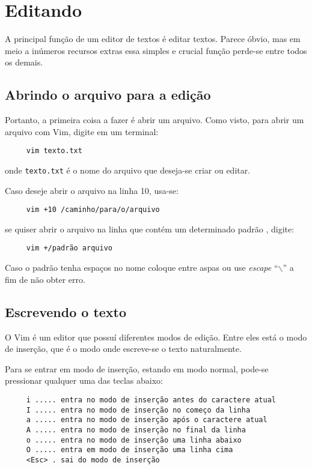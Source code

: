
\chapter{Editando}
\label{Editando}
A principal função de um editor de textos é editar textos. 
Parece óbvio, mas em meio a inúmeros recursos extras essa simples e crucial
função perde-se entre todos os demais.

\section{Abrindo o arquivo para a edição}
Portanto, a primeira coisa a fazer é abrir um arquivo.
Como visto, para abrir um arquivo com Vim, digite em um terminal:
%
\begin{verbatim}
     vim texto.txt
\end{verbatim}
onde {\tt texto.txt} é o nome do arquivo que deseja-se criar ou editar.

Caso deseje abrir o arquivo na linha 10, usa-se:
\begin{verbatim}
     vim +10 /caminho/para/o/arquivo
\end{verbatim}
se quiser abrir o arquivo na linha que contém um determinado padrão
, digite:
\begin{verbatim}
     vim +/padrão arquivo
\end{verbatim}

{\Large {}} Caso o padrão tenha espaços no nome coloque entre aspas ou
use {\em escape} ``$\backslash$'' a fim de não obter erro.

\section{Escrevendo o texto}
O Vim é um editor que possuí diferentes modos de edição. Entre eles está o modo
de inserção, que é o modo onde escreve-se o texto naturalmente.

Para se entrar em modo de inserção, estando em modo normal, pode-se pressionar 
qualquer uma das teclas abaixo:
\begin{verbatim}
     i ..... entra no modo de inserção antes do caractere atual
     I ..... entra no modo de inserção no começo da linha
     a ..... entra no modo de inserção após o caractere atual
     A ..... entra no modo de inserção no final da linha
     o ..... entra no modo de inserção uma linha abaixo
     O ..... entra em modo de inserção uma linha cima
     <Esc> . sai do modo de inserção
\end{verbatim}

